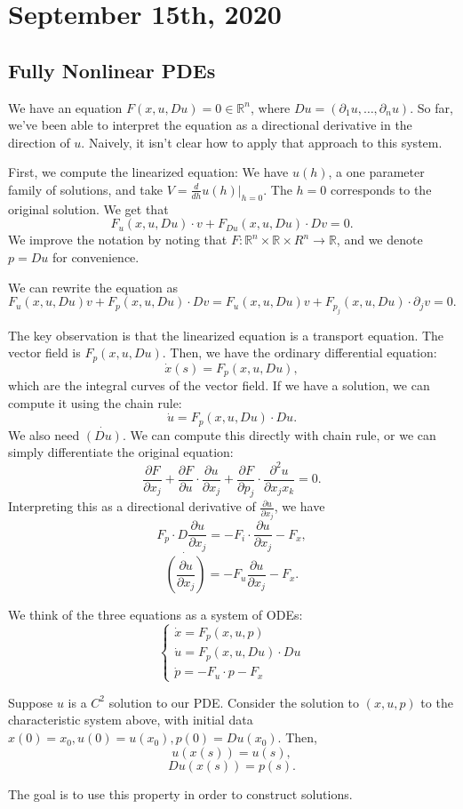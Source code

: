 \documentclass[11pt]{scrartcl}
\newcommand{\R}{\mathbb{R}}
\begin{document}
\section{September 15th, 2020}
\subsection{Fully Nonlinear PDEs}
We have an equation $F(x, u, Du) = 0 \in \R^n$, where $Du = (\partial_1 u, \dots, \partial_n u)$.  So far, we've been able to interpret the equation as a directional derivative in the direction of $u$.  Naively, it isn't clear how to apply that approach to this system.

First, we compute the linearized equation: We have $u(h)$, a one parameter family of solutions, and take $V = \frac{d}{dh}u(h)\vert_{h = 0}.$  The $h = 0$ corresponds to the original solution.  We get that $$F_u(x, u, Du) \cdot v + F_{Du}(x, u, Du) \cdot Dv = 0.$$
We improve the notation by noting that $F: \R^n \times \R \times R^n \rightarrow \R$, and we denote $p = Du$ for convenience.  

We can rewrite the equation as 
$$F_u(x, u, Du)v + F_p(x, u, Du) \cdot Dv = F_u(x, u, Du)v + F_{p_j}(x, u, Du) \cdot \partial_j v = 0.$$

The key observation is that the linearized equation is a transport equation.  The vector field is $F_p(x, u, Du)$.  Then, we have the ordinary differential equation:
$$\dot{x}(s) = F_p(x, u, Du),$$
which are the integral curves of the vector field.  If we have a solution, we can compute it using the chain rule:
$$\dot u = F_p(x, u, Du) \cdot Du.$$
We also need $\dot{(Du)}$.  We can compute this directly with chain rule, or we can simply differentiate the original equation:
$$\frac{\partial F}{\partial x_j} + \frac{\partial F}{\partial u} \cdot \frac{\partial u}{\partial x_j} + \frac{\partial F}{\partial p_j}\cdot \frac{\partial^2 u}{\partial x_jx_k} = 0.$$
Interpreting this as a directional derivative of $\frac{\partial u}{\partial x_j}$, we have 
$$F_p \cdot D \frac{\partial u}{\partial x_j} = -F_i \cdot \frac{\partial u}{\partial x_j} - F_x,$$
$$\dot{\left (\frac{\partial u}{\partial x_j}\right )} = -F_u \frac{\partial u}{\partial x_j} - F_x.$$

We think of the three equations as a system of ODEs:
$$\begin{cases}
\dot{x} = F_p(x, u, p)\\
\dot u = F_p(x, u, Du) \cdot Du\\
\dot p = - F_u \cdot p - F_x
\end{cases}
$$
\begin{lemma} Suppose $u$ is a $C^2$ solution to our PDE.  Consider the solution to $(x, u, p)$ to the characteristic system above, with initial data $x(0) = x_0, u(0) = u(x_0), p(0) = Du(x_0)$.  Then, $$u(x(s)) = u(s),$$
$$Du(x(s)) = p(s).$$
\end{lemma}
The goal is to use this property in order to construct solutions.  
\end{document}
